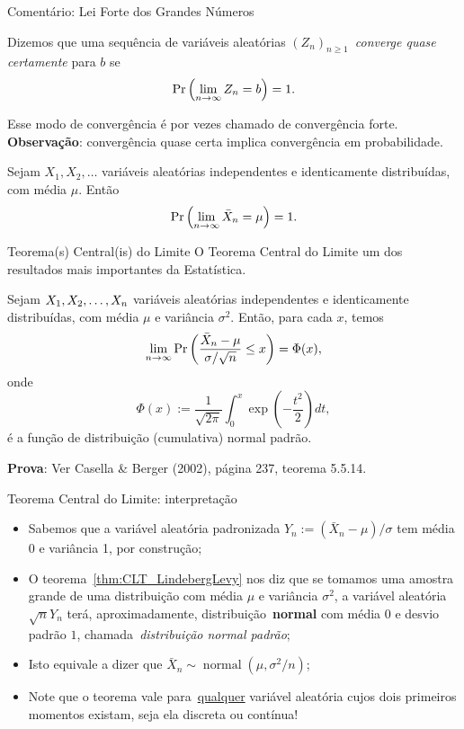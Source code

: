 \begin{frame}{Comentário: Lei Forte dos Grandes Números}
\begin{defn}
 \label{dfn:as_convergence}
Dizemos que uma sequência de variáveis aleatórias $\left(Z_n\right)_{n\geq 1}$~\textit{converge quase certamente} para $b$ se
$$\operatorname{Pr}\left(\lim_{n\to \infty} Z_n = b\right) = 1.$$
\end{defn}
Esse modo de convergência é por vezes chamado de convergência forte.
\textbf{Observação}: convergência quase certa implica convergência em probabilidade.
 \begin{theo}
  \label{thm:SLLN}
   Sejam  $X_1, X_2, \ldots $ variáveis aleatórias independentes e identicamente distribuídas, com média $\mu$.
 Então
 $$\operatorname{Pr}\left(\lim_{n\to \infty} \bar{X}_n = \mu \right) = 1.$$
 \end{theo}
\end{frame}
\begin{frame}[fragile]{Teorema(s) Central(is) do Limite}
O Teorema Central do Limite um dos resultados mais importantes da Estatística.
\begin{theo}
 \label{thm:CLT_LindebergLevy}
Sejam  $X_1, X_2, \ldots, X_n$ variáveis aleatórias independentes e identicamente distribuídas, com média $\mu$ e variância $\sigma^2$.
Então, para cada $x$, temos
$$ \lim_{n\to\infty} \operatorname{Pr}\left( \frac{\bar{X}_n - \mu}{\sigma/\sqrt{n}} \leq x \right) = \Phi(x), $$
onde 
$$\Phi(x) := \frac{1}{\sqrt{2\pi}}\int_0^x \exp\left(-\frac{t^2}{2}\right)dt,$$
é a função de distribuição (cumulativa) normal padrão.
\end{theo}
\textbf{Prova}: Ver Casella \& Berger (2002), página 237, teorema 5.5.14.
% 
\end{frame}
\begin{frame}{Teorema Central do Limite: interpretação}
\begin{itemize}
 \item Sabemos que a variável aleatória padronizada $Y_n := \left(\bar{X}_n - \mu\right)/\sigma$ tem média 0 e variância 1, por construção;
 \item O teorema~\ref{thm:CLT_LindebergLevy} nos diz que se tomamos uma amostra grande de uma distribuição com média $\mu$ e variância $\sigma^2$, a variável aleatória $\sqrt{n}Y_n$ terá, aproximadamente, distribuição~\textbf{normal} com média 0 e desvio padrão $1$, chamada~\textit{distribuição normal padrão};
 \item Isto equivale a dizer que $\bar{X}_n \sim \operatorname{normal}(\mu, \sigma^2/n)$;
 \item Note que o teorema vale para~\underline{qualquer} variável aleatória cujos dois primeiros momentos existam, seja ela discreta ou contínua!
\end{itemize}
\end{frame}
